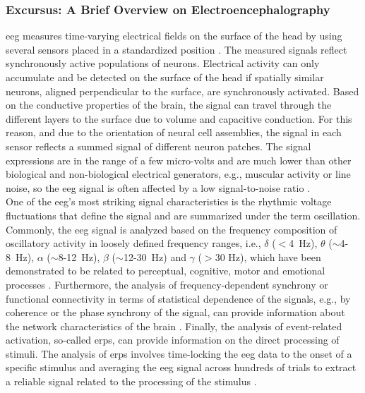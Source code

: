 \begin{tcolorbox}
    \subsubsection{Excursus: A Brief Overview on Electroencephalography}
    \Gls{eeg} measures time-varying electrical fields on the surface of the head by using several sensors placed in a standardized position \cite{Jackson2014}. The measured signals reflect synchronously active populations of neurons. Electrical activity can only accumulate and be detected on the surface of the head if spatially similar neurons, aligned perpendicular to the surface, are synchronously activated. Based on the conductive properties of the brain, the signal can travel through the different layers to the surface due to volume and capacitive conduction. For this reason, and due to the orientation of neural cell assemblies, the signal in each sensor reflects a summed signal of different neuron patches. The signal expressions are in the range of a few micro-volts and are much lower than other biological and non-biological electrical generators, e.g., muscular activity or line noise, so the \gls{eeg} signal is often affected by a low signal-to-noise ratio \cite{CohenX2017}.\\
    One of the \gls{eeg}'s most striking signal characteristics is the rhythmic voltage fluctuations that define the signal and are summarized under the term oscillation. Commonly, the \gls{eeg} signal is analyzed based on the frequency composition of oscillatory activity in loosely defined frequency ranges, i.e., $\delta$ ($<$4~Hz), $\theta$ ($\sim$4-8~Hz), $\alpha$ ($\sim$8-12~Hz), $\beta$ ($\sim$12-30~Hz) and $\gamma$ ($>$30 Hz), which have been demonstrated to be related to perceptual, cognitive, motor and emotional processes \cite{CohenX2017}. Furthermore, the analysis of frequency-dependent synchrony or functional connectivity in terms of statistical dependence of the signals, e.g., by coherence or the phase synchrony of the signal, can provide information about the network characteristics of the brain \cite{Siegel2012}. Finally, the analysis of event-related activation, so-called \glspl{erp}, can provide information on the direct processing of stimuli. The analysis of \glspl{erp} involves time-locking the \gls{eeg} data to the onset of a specific stimulus and averaging the \gls{eeg} signal across hundreds of trials to extract a reliable signal related to the processing of the stimulus \cite{CohenX2014}.
\end{tcolorbox}

